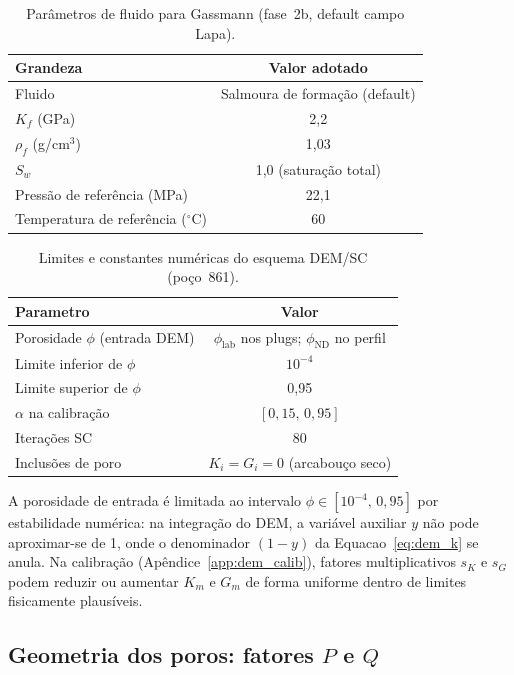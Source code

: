 \documentclass[11pt,a4paper]{article}
\numberwithin{equation}{section}
\newcommand{\philab}{\ensuremath{\phi_{\mathrm{lab}}}}
\newcommand{\phiND}{\ensuremath{\phi_{\mathrm{ND}}}}
\begin{document}
\begin{table}[H]
  \centering
  \caption{Parâmetros de fluido para Gassmann (fase~2b, default campo Lapa).}
  \label{tab:app_pvt}
  \begin{tabular}{lc}
    \toprule
    Grandeza & Valor adotado \\
    \midrule
    Fluido & Salmoura de formação (default) \\
    $K_f$ (GPa) & 2,2 \\
    $\rho_f$ (g/cm$^3$) & 1,03 \\
    $S_w$ & 1,0 (saturação total) \\
    Pressão de referência (MPa) & 22,1 \\
    Temperatura de referência ($^\circ$C) & 60 \\
    \bottomrule
  \end{tabular}
\end{table}

\begin{table}[H]
  \centering
  \caption{Limites e constantes numéricas do esquema DEM/SC (poço~861).}
  \label{tab:app_numerical}
  \begin{tabular}{lc}
    \toprule
    Parametro & Valor \\
    \midrule
    Porosidade $\phi$ (entrada DEM) & \philab{} nos plugs; \phiND{} no perfil \\
    Limite inferior de $\phi$ & $10^{-4}$ \\
    Limite superior de $\phi$ & 0,95 \\
    $\alpha$ na calibração & $[0{,}15,\,0{,}95]$ \\
    Iterações SC & 80 \\
    Inclusões de poro & $K_i = G_i = 0$ (arcabouço seco) \\
    \bottomrule
  \end{tabular}
\end{table}

A porosidade de entrada é limitada ao intervalo
$\phi \in [10^{-4},\,0{,}95]$ por estabilidade numérica: na integração do DEM,
a variável auxiliar $y$ não pode aproximar-se de 1, onde o denominador
$(1-y)$ da Equacao~\eqref{eq:dem_k} se anula.
Na calibração (Apêndice~\ref{app:dem_calib}), fatores multiplicativos $s_K$ e
$s_G$ podem reduzir ou aumentar $K_m$ e $G_m$ de forma uniforme dentro de
limites fisicamente plausíveis.

\subsection{Geometria dos poros: fatores $P$ e $Q$}
\end{document}

